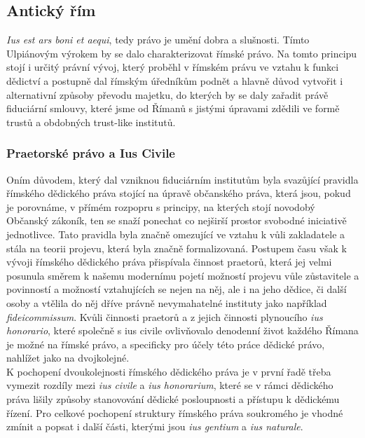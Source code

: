 \documentclass{article}
\begin{document}
\subsection{Antický řím}

\textit{Ius est ars boni et aequi}, tedy právo je umění dobra a slušnosti. Tímto Ulpiá\-novým výrokem by se dalo charakterizovat římské právo. Na tomto principu stojí i určitý právní vývoj, který proběhl v římském právu ve vztahu k funkci dědictví a postupně dal římským úředníkům podnět a hlavně důvod vytvořit i alternativní způsoby převodu majetku, do kterých by se daly zařadit právě fiduciární smlouvy, které jsme od Římanů s jistými úpravami zdědili ve formě trustů a obdobných trust-like institutů.%

\subsubsection{Praetorské právo a Ius Civile}

Oním důvodem, který dal vzniknou fiduciárním institutům byla svazůjící pravid\-la římského dědického práva stojící na úpravě občanského práva, která jsou, pokud je porovnáme, v přímém rozpopru s principy, na kterých stojí novodobý Občanský zákoník, ten se snaží ponechat co nejširší prostor svobodné iniciativě jednotlivce. Tato pravidla byla značně omezující ve vztahu k vůli zakladatele a stála na teorii projevu, která byla značně formalizovaná. Postupem času však k vývoji římského dědického práva přispívala činnost praetorů, která jej velmi posunula směrem k našemu modernímu pojetí možností projevu vůle zůstavitele a povinností a možností vztahujících se nejen na něj, ale i na jeho dědice, či další osoby a vtělila do něj dříve právně nevymahatelné instituty jako například \textit{fideicommissum}. Kvůli činnosti praetorů a z jejich činnosti plynoucího \textit{ius honorario}, které společně s {ius civile} ovlivňovalo denodenní život každého Římana je možné na římské právo, a specificky pro účely této práce dědické právo, nahlížet jako na dvojkolejné.\\

K pochopení dvoukolejnosti římského dědického práva je v první řadě třeba vymezit rozdíly mezi \textit{ius civile} a \textit{ius honorarium}, které se v rámci dědického práva lišily způsoby stanovování dědické posloupnosti a přístupu k dědickému řízení. Pro celkové pochopení struktury římského práva soukromého je vhodné zmínit a popsat i další části, kterými jsou \textit{ius gentium} a \textit{ius naturale}. \\
\end{document}
